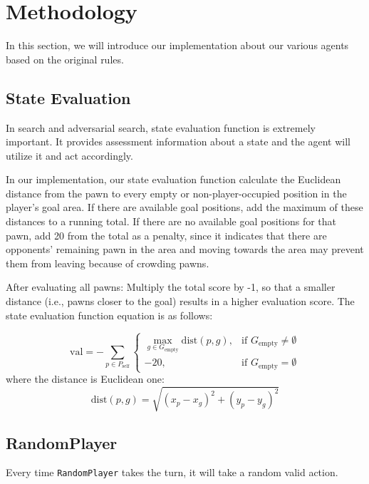 \section{Methodology}
In this section, we will introduce our implementation about our various agents based on the original rules.

\subsection{State Evaluation}
In search and adversarial search, state evaluation function is extremely important. It provides assessment information about a state and the agent will utilize  it and act accordingly.

In our implementation, our state evaluation function calculate the Euclidean distance from the pawn to every empty or non-player-occupied position in the player's goal area. If there are available goal positions, add the maximum of these distances to a running total.
If there are no available goal positions for that pawn, add 20 from the total as a penalty, since it indicates that there are opponents' remaining pawn in the area and moving towards the area may prevent them from leaving because of crowding pawns. 

After evaluating all pawns: Multiply the total score by -1, so that a smaller distance (i.e., pawns closer to the goal) results in a higher evaluation score. The state evaluation function equation is as follows:

\begin{equation}
\text{val} = - \sum_{p \in P_{\text{self}}} \left\{
\begin{array}{ll}
\max_{g \in G_{\text{empty}}} \text{dist}(p, g), & \text{if } G_{\text{empty}} \neq \emptyset \\
-20, & \text{if } G_{\text{empty}} = \emptyset
\end{array}
\right.
\end{equation}
where the distance is Euclidean one:
\begin{equation}
    \text{dist}(p, g) = \sqrt{(x_p - x_g)^2 + (y_p - y_g)^2}
\end{equation}

\subsection{RandomPlayer}
Every time \texttt{RandomPlayer} takes the turn, it will take a random valid action. 

